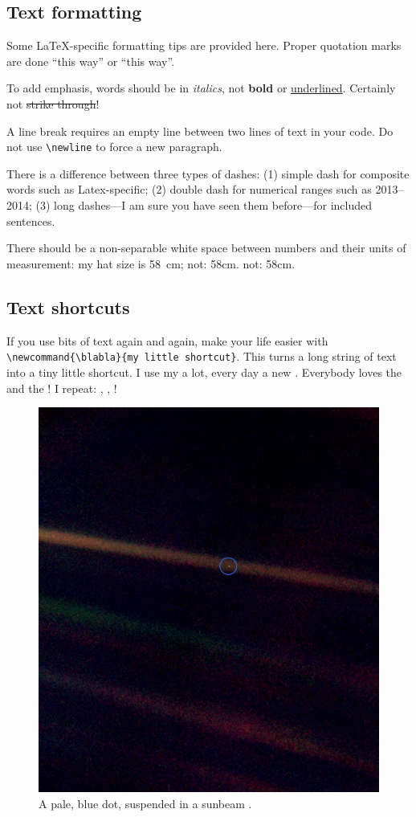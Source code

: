 \subsection{Text formatting}
Some \LaTeX-specific formatting tips are provided here. Proper quotation marks are done ``this way'' or \enquote{this way}. 

To add emphasis, words should be in \textit{italics}, not \textbf{bold} or \underline{underlined}. Certainly not \st{strike through}!

A line break requires an empty line between two lines of text in your code. Do not use \verb+\newline+ to force a new paragraph.

There is a difference between three types of dashes: (1) simple dash for composite words such as Latex-specific; (2) double dash for numerical ranges such as 2013--2014; (3) long dashes---I am sure you have seen them before---for included sentences.

There should be a non-separable white space between numbers and their units of measurement: my hat size is 58~cm; not: 58cm. not: 58\newline cm.



\subsection{Text shortcuts}
If you use bits of text again and again, make your life easier with
\newline
 \verb+ \newcommand{\blabla}{my little shortcut}+. This turns a long string of text into a tiny little shortcut. I use my \fc a lot, every day a new \fc. Everybody loves the \fc and the \roc! I repeat: \roc, \roc, \roc!




\begin{figure}[t]
	\centering
	\includegraphics[width=0.25\linewidth]{Figures/PaleBlueDot.jpg}
	\caption{A pale, blue dot, suspended in a sunbeam \citep{NASA}.}
	\label{samplefig}
\end{figure}


